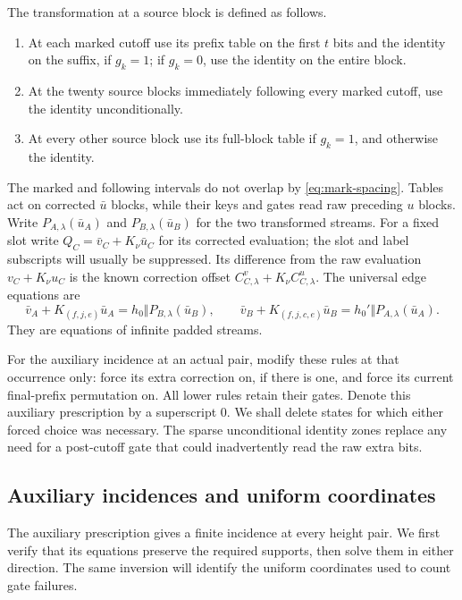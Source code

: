 The transformation at a source block is defined as follows.
\begin{enumerate}
\item At each marked cutoff use its prefix table on the first $t$ bits
and the identity on the suffix, if $g_k=1$; if $g_k=0$, use the identity
on the entire block.
\item At the twenty source blocks immediately following every marked
cutoff, use the identity unconditionally.
\item At every other source block use its full-block table if $g_k=1$,
and otherwise the identity.
\end{enumerate}
The marked and following intervals do not overlap by
\eqref{eq:mark-spacing}.  Tables act on corrected $\bar u$ blocks, while
their keys and gates read raw preceding $u$ blocks.  Write
$P_{A,\lambda}(\bar u_A)$ and $P_{B,\lambda}(\bar u_B)$ for the two
transformed streams.  For a fixed slot write
$Q_C=\bar v_C+K_\nu\bar u_C$ for its corrected evaluation; the slot
and label subscripts will usually be suppressed.  Its difference from
the raw evaluation $v_C+K_\nu u_C$ is the known correction offset
$C^v_{C,\lambda}+K_\nu C^u_{C,\lambda}$.
The universal edge equations are
\begin{equation}\label{eq:universal-edge-equations}
 \boxed{\quad
 \bar v_A+K_{(f,j,e)}\bar u_A
       =h_0\Vert P_{B,\lambda}(\bar u_B),\qquad
 \bar v_B+K_{(f,j,c,e)}\bar u_B
       =h_0'\Vert P_{A,\lambda}(\bar u_A).
 \quad}
\end{equation}
They are equations of infinite padded streams.

For the auxiliary incidence at an actual pair, modify these rules at
that occurrence only: force its extra correction on, if there is one,
and force its current final-prefix permutation on.  All lower rules
retain their gates.  Denote this auxiliary prescription by a superscript
$0$.  We shall delete states for which either forced choice was necessary.
The sparse unconditional identity zones replace any need for a
post-cutoff gate that could inadvertently read the raw extra bits.

\subsection{Auxiliary incidences and uniform coordinates}

The auxiliary prescription gives a finite incidence at every height pair.
We first verify that its equations preserve the required supports, then
solve them in either direction.  The same inversion will identify the
uniform coordinates used to count gate failures.

